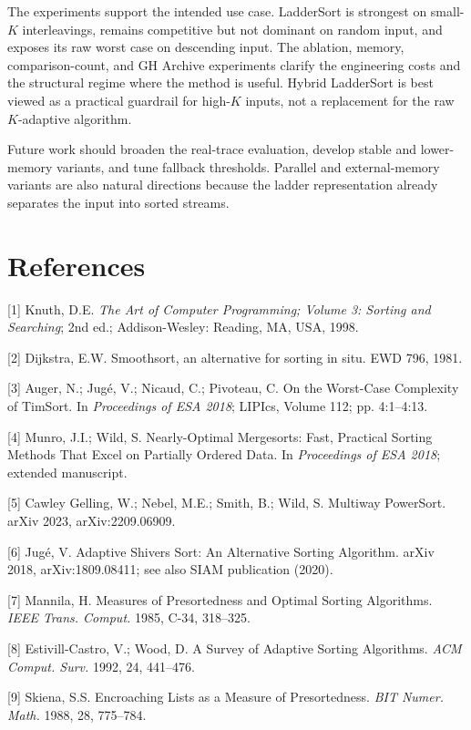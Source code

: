\documentclass[10pt]{article}
\begin{document}
The experiments support the intended use case. LadderSort is strongest on small-\(K\) interleavings, remains competitive but not dominant on random input, and exposes its raw worst case on descending input. The ablation, memory, comparison-count, and GH Archive experiments clarify the engineering costs and the structural regime where the method is useful. Hybrid LadderSort is best viewed as a practical guardrail for high-\(K\) inputs, not a replacement for the raw \(K\)-adaptive algorithm.

Future work should broaden the real-trace evaluation, develop stable and lower-memory variants, and tune fallback thresholds. Parallel and external-memory variants are also natural directions because the ladder representation already separates the input into sorted streams.

\section{References}\label{references}

{[}1{]} Knuth, D.E. \emph{The Art of Computer Programming; Volume 3: Sorting and Searching}; 2nd ed.; Addison-Wesley: Reading, MA, USA, 1998.

{[}2{]} Dijkstra, E.W. Smoothsort, an alternative for sorting in situ. EWD 796, 1981.

{[}3{]} Auger, N.; Jugé, V.; Nicaud, C.; Pivoteau, C. On the Worst-Case Complexity of TimSort. In \emph{Proceedings of ESA 2018}; LIPIcs, Volume 112; pp. 4:1--4:13.

{[}4{]} Munro, J.I.; Wild, S. Nearly-Optimal Mergesorts: Fast, Practical Sorting Methods That Excel on Partially Ordered Data. In \emph{Proceedings of ESA 2018}; extended manuscript.

{[}5{]} Cawley Gelling, W.; Nebel, M.E.; Smith, B.; Wild, S. Multiway PowerSort. arXiv 2023, arXiv:2209.06909.

{[}6{]} Jugé, V. Adaptive Shivers Sort: An Alternative Sorting Algorithm. arXiv 2018, arXiv:1809.08411; see also SIAM publication (2020).

{[}7{]} Mannila, H. Measures of Presortedness and Optimal Sorting Algorithms. \emph{IEEE Trans. Comput.} 1985, C-34, 318--325.

{[}8{]} Estivill-Castro, V.; Wood, D. A Survey of Adaptive Sorting Algorithms. \emph{ACM Comput. Surv.} 1992, 24, 441--476.

{[}9{]} Skiena, S.S. Encroaching Lists as a Measure of Presortedness. \emph{BIT Numer. Math.} 1988, 28, 775--784.
\end{document}
